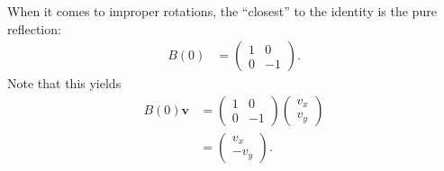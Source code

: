 \documentclass[10pt]{mypackage}
\begin{document}
When it comes to improper rotations, the ``closest'' to the identity is the pure reflection:
\begin{align*}
  B(0) &= \begin{pmatrix}1 & 0 \\ 0 & -1\end{pmatrix}.
\end{align*}
Note that this yields
\begin{align*}
  B(0) \mathbf{v} &=  \begin{pmatrix}1 & 0 \\ 0 & -1\end{pmatrix} \begin{pmatrix}v_x\\v_y\end{pmatrix}\\
                 &= \begin{pmatrix}v_x \\ -v_y\end{pmatrix}.
\end{align*}
\end{document}
